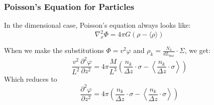 \documentclass{article}
\newcommand{\pd}{\partial}
\begin{document}
\subsubsection{Poisson's Equation for Particles}
In the dimensional case, Poisson's equation always looks like:
\begin{equation*}
    \nabla_x^2 \Phi = 4\pi G (\rho - \langle \rho \rangle) 
\end{equation*}

When we make the substitutions $\Phi = v^2 \varphi$ and $\rho_k = \frac{N_k}{dL_{box}}\cdot \Sigma$, we get:
\begin{equation*}
    \frac{v^2}{L^2}\frac{\pd^2 \varphi}{\pd z^2} = 4\pi \frac{M}{L^3} \left( \frac{n_k}{\Delta z}\cdot \sigma - \left\langle \frac{n_k}{\Delta z}\cdot \sigma \right\rangle\right)
\end{equation*}
Which reduces to
\begin{equation}
    \frac{\pd^2 \varphi}{\pd z^2} = 4\pi \left( \frac{n_k}{\Delta z}\cdot \sigma - \left\langle \frac{n_k}{\Delta z}\cdot \sigma \right\rangle\right)
\end{equation}
\end{document}
